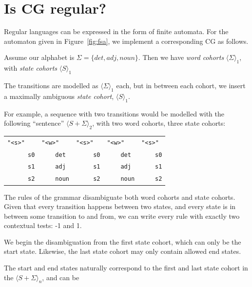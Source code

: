 \documentclass[11pt]{article}
\def\t#1{\texttt{#1}}
\begin{document}
\section{Is CG regular?}

Regular languages can be expressed in the form of finite automata.
For the automaton given in Figure~\ref{fig:fsa}, we implement a corresponding 
CG as follows.

Assume our alphabet is $\Sigma = \{det,adj,noun\}$. Then we have \emph{word cohorts}
$\langle \Sigma \rangle_1$, with \emph{state cohorts} $\langle S \rangle_1$

The transitions are modelled as $\langle \Sigma \rangle_1$ each, but in between each
cohort, we insert a maximally ambiguous \emph{state cohort}, $\langle S \rangle_1$.


For example, a sequence with two transitions would be modelled with the following 
``sentence'' $\langle S+\Sigma \rangle_2$, with two word cohorts, three state cohorts:

\begin{table}[h]
\centering
\begin{tabular}{lllll}
      \t{"<s>"} &  \t{"<w>"}   &      \t{"<s>"} &     \t{"<w>"} &     \t{"<s>"} \\
 ~~~~~~\t{s0}   & ~~~~\t{det}  &  ~~~~\t{ s0}   &  ~~~~\t{det}  &  ~~~~\t{s0}   \\
 ~~~~~~\t{s1}   & ~~~~\t{adj}  &  ~~~~\t{ s1}   &  ~~~~\t{adj}  &  ~~~~\t{s1}    \\
 ~~~~~~\t{s2}   & ~~~~\t{noun} &  ~~~~\t{ s2}   &  ~~~~\t{noun} &  ~~~~\t{s2}  
\end{tabular}
\end{table}

The rules of the grammar disambiguate both word cohorts and state cohorts. 
Given that every transition happens between two states, and every state is 
in between some transition to and from, we can write every rule with exactly
two contextual tests: -1 and 1. 

We begin the disambiguation from the first state cohort, which can only be
the start state. Likewise, the last state cohort may only contain allowed end states.


The start and end states naturally
correspond to the first and last state cohort in the  $\langle S+\Sigma \rangle_n$,
and can be 


\end{document}
